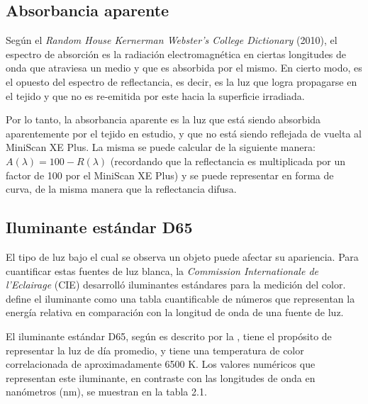 	\subsection{Absorbancia aparente}
	
	Seg\'{u}n el \textit{Random House Kernerman Webster's College Dictionary} (2010), el espectro de absorci\'{o}n es la radiaci\'{o}n electromagn\'{e}tica en ciertas longitudes de onda que atraviesa un medio y que es absorbida por el mismo. En cierto modo, es el opuesto del espectro de reflectancia, es decir, es la luz que logra propagarse en el tejido y que no es re-emitida por este hacia la superficie irradiada. 
	
	Por lo tanto, la absorbancia aparente es la luz que est\'{a} siendo absorbida aparentemente por el tejido en estudio, y que no est\'{a} siendo reflejada de vuelta al MiniScan XE Plus. La misma se puede calcular de la siguiente manera: $A(\lambda) = 100 - R(\lambda)$ (recordando que la reflectancia es multiplicada por un factor de 100 por el MiniScan XE Plus) y se puede representar en forma de curva, de la misma manera que la reflectancia difusa.

	\subsection{Iluminante est\'{a}ndar D65}
		
		El tipo de luz bajo el cual se observa un objeto puede afectar su apariencia. Para cuantificar estas fuentes de luz blanca, la \textit{Commission Internationale de l'Eclairage} (CIE) desarroll\'{o} iluminantes est\'{a}ndares para la medici\'{o}n del color.
		\cite{HunterLab} define el iluminante como una tabla cuantificable de n\'{u}meros que representan la energ\'{i}a relativa en comparaci\'{o}n con la longitud de onda de una fuente de luz. 
		
		El iluminante est\'{a}ndar D65, seg\'{u}n es descrito por la \cite{CIE}, tiene el prop\'{o}sito de representar la luz de d\'{i}a promedio, y tiene una temperatura de color correlacionada de aproximadamente 6500 K\degree. Los valores num\'{e}ricos que representan este iluminante, en contraste con las longitudes de onda en nan\'{o}metros (nm), se muestran en la tabla 2.1.
	
